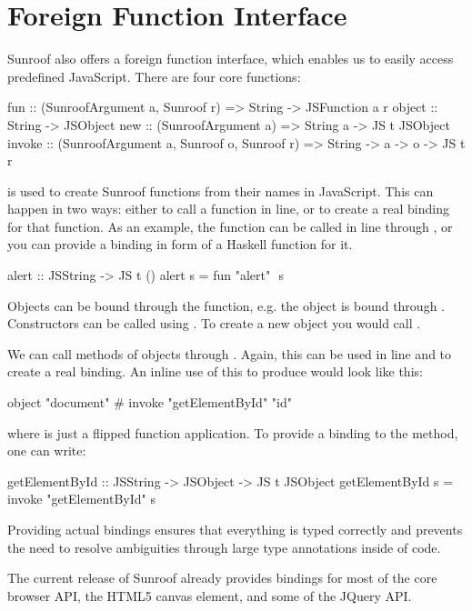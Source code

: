  
\section{Foreign Function Interface}
\label{sec:ffi}

Sunroof also offers a 
foreign function interface, which enables us to easily 
access predefined JavaScript. There are four core functions:
\begin{Code}
fun    :: (SunroofArgument a, Sunroof r) 
       => String -> JSFunction a r
object :: String -> JSObject
new    :: (SunroofArgument a) 
       => String a -> JS t JSObject
invoke :: (SunroofArgument a, Sunroof o, Sunroof r) 
       => String -> a -> o -> JS t r
\end{Code}
 is used to create Sunroof functions from their names in JavaScript.
This can happen in two ways: either to call a function in line, or to 
create a real binding for that function. As an example, 
the  function can be called in line through ,
or you can provide a binding in form of a Haskell function for it.
\begin{Code}
alert :: JSString -> JS t ()
alert s = fun "alert" $$ s
\end{Code}

Objects can be bound through the  function, e.g.
the  object is bound through .
Constructors can be called using . To create a new
object you would call .

We can call methods of objects through . Again, this 
can be used in line and to create a real binding. An inline 
use of this to produce  would look like this: 
\begin{Code}
object "document" # invoke "getElementById" "id"
\end{Code}
where \Src{\#} is just a flipped function application. To provide a binding 
to the  method, one can write:
\begin{Code}
getElementById :: JSString -> JSObject -> JS t JSObject
getElementById s = invoke "getElementById" s
\end{Code}

Providing actual bindings ensures that
everything is typed correctly and prevents the need to resolve ambiguities 
through large type annotations inside of code.

The current release of Sunroof already provides bindings for most of the 
core browser API, the HTML5 canvas element, and some of the JQuery API.

